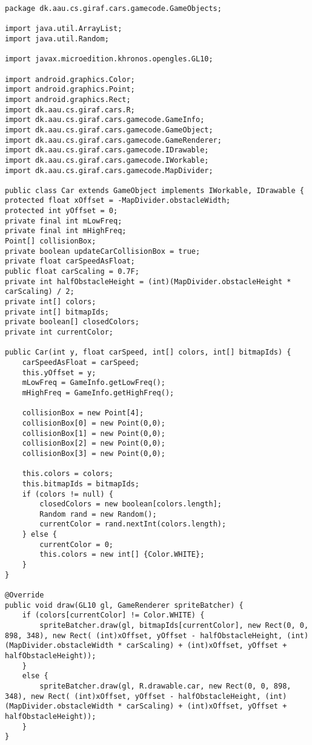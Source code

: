 \begin{lstlisting}[style=csharp,label=car_class, caption={Car class from the original Cars project.}]
package dk.aau.cs.giraf.cars.gamecode.GameObjects;

import java.util.ArrayList;
import java.util.Random;

import javax.microedition.khronos.opengles.GL10;

import android.graphics.Color;
import android.graphics.Point;
import android.graphics.Rect;
import dk.aau.cs.giraf.cars.R;
import dk.aau.cs.giraf.cars.gamecode.GameInfo;
import dk.aau.cs.giraf.cars.gamecode.GameObject;
import dk.aau.cs.giraf.cars.gamecode.GameRenderer;
import dk.aau.cs.giraf.cars.gamecode.IDrawable;
import dk.aau.cs.giraf.cars.gamecode.IWorkable;
import dk.aau.cs.giraf.cars.gamecode.MapDivider;

public class Car extends GameObject implements IWorkable, IDrawable {
protected float xOffset = -MapDivider.obstacleWidth;
protected int yOffset = 0;
private final int mLowFreq;
private final int mHighFreq;
Point[] collisionBox;
private boolean updateCarCollisionBox = true;
private float carSpeedAsFloat;
public float carScaling = 0.7F;
private int halfObstacleHeight = (int)(MapDivider.obstacleHeight * carScaling) / 2;
private int[] colors;
private int[] bitmapIds;
private boolean[] closedColors;
private int currentColor;
	
public Car(int y, float carSpeed, int[] colors, int[] bitmapIds) {
	carSpeedAsFloat = carSpeed;
	this.yOffset = y;
	mLowFreq = GameInfo.getLowFreq();
	mHighFreq = GameInfo.getHighFreq();
		
	collisionBox = new Point[4];
	collisionBox[0] = new Point(0,0);
	collisionBox[1] = new Point(0,0);
	collisionBox[2] = new Point(0,0);
	collisionBox[3] = new Point(0,0);
	
	this.colors = colors;
	this.bitmapIds = bitmapIds;
	if (colors != null) {
		closedColors = new boolean[colors.length];
		Random rand = new Random();
		currentColor = rand.nextInt(colors.length);
	} else {
		currentColor = 0;
		this.colors = new int[] {Color.WHITE};
	}		
}
	
@Override
public void draw(GL10 gl, GameRenderer spriteBatcher) {
	if (colors[currentColor] != Color.WHITE) {
		spriteBatcher.draw(gl, bitmapIds[currentColor], new Rect(0, 0, 898, 348), new Rect( (int)xOffset, yOffset - halfObstacleHeight, (int)(MapDivider.obstacleWidth * carScaling) + (int)xOffset, yOffset + halfObstacleHeight));
	}
	else {
		spriteBatcher.draw(gl, R.drawable.car, new Rect(0, 0, 898, 348), new Rect( (int)xOffset, yOffset - halfObstacleHeight, (int)(MapDivider.obstacleWidth * carScaling) + (int)xOffset, yOffset + halfObstacleHeight));
	}
}


\end{lstlisting}
